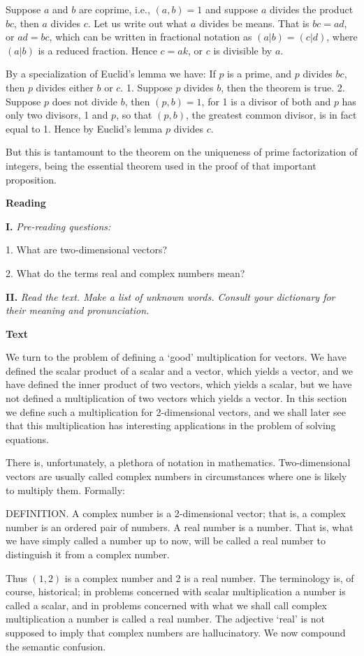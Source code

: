\documentclass[a4paper]{article}
\newcounter{EUnits}
\newcommand{\EUnit}{\par\medskip{\huge \textbf{Unit \arabic{EUnits}}}\par\stepcounter{EUnits}}
\newcommand{\ESect}[1]{\medskip\par{\large \textbf{#1}}\par}
\newcommand{\ETask}[2]{\medskip\par\textbf{#1.} \textit{#2}\par}
\begin{document}
Suppose $a$ and $b$ are coprime, i.e., $(a, b) = 1$ and suppose $a$ divides the product $bc$, then $a$ divides $c$. Let us
write out what $a$ divides be means. That is $bc = ad$, or $ad = bc$, which can be written in fractional notation as
$(a|b)=(c|d)$, where $(a|b)$ is a reduced fraction. Hence $c=ak$, or $c$ is divisible by $a$.

By a specialization of Euclid's lemma we have: If $p$ is a prime, and $p$ divides $bc$, then $p$ divides either $b$ or $c$.
1. Suppose $p$ divides $b$, then the theorem is true. 2. Suppose $p$ does not divide $b$, then $(p, b) = 1$, for 1 is a
divisor of both and $p$ has only two divisors, 1 and $p$, so that $(p, b)$, the greatest common divisor, is in fact equal
to 1. Hence by Euclid's lemma $p$ divides $c$.

But this is tantamount to the theorem on the uniqueness of prime factorization of integers, being the essential theorem
used in the proof of that important proposition.

\EUnit
\ESect{Reading}
\ETask{I}{Pre-reading questions:}
1. What are two-dimensional vectors?

2. What do the terms real and complex numbers mean?

\ETask{II}{Read the text. Make a list of unknown words. Consult your dictionary for their meaning and pronunciation.}

\ESect{Text}

We turn to the problem of defining a `good' multiplication for vectors. We have defined the scalar product of a scalar and a
vector, which yields a vector, and we have defined the inner product of two vectors, which yields a scalar, but we have not
defined a multiplication of two vectors which yields a vector. In this section we define such a multiplication for 2-dimensional
vectors, and we shall later see that this multiplication has interesting applications in the problem of solving equations.

There is, unfortunately, a plethora of notation in mathematics. Two-dimensional vectors are usually called complex numbers in
circumstances where one is likely to multiply them. Formally:

DEFINITION. A complex number is a 2-dimensional vector; that is, a complex number is an ordered pair of numbers. A real number
is a number. That is, what we have simply called a number up to now, will be called a real number to distinguish it from a complex
number.

Thus $(1, 2)$ is a complex number and 2 is a real number. The terminology is, of course, historical; in problems concerned with
scalar multiplication a number is called a scalar, and in problems concerned with what we shall call complex multiplication a
number is called a real number. The adjective `real' is not supposed to imply that complex numbers are hallucinatory. We now
compound the semantic confusion.
\end{document}
